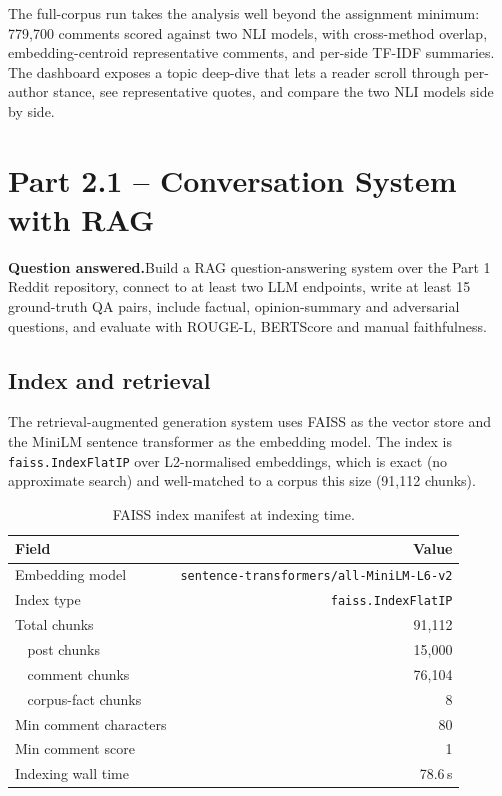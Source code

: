 \documentclass[11pt,a4paper]{article}
\newenvironment{extrabox}{%
  \par\medskip\noindent
  \def\FrameCommand{\fboxsep=6pt\fboxrule=0.6pt%
    \fcolorbox{extraboxrule}{extraboxbg}}%
  \MakeFramed{\advance\hsize-2\fboxsep\FrameRestore}%
  \noindent{\sffamily\bfseries\color{extraboxrule}Extra step.}\quad\ignorespaces%
}{\endMakeFramed\par\medskip}
\newcommand{\questionanswered}[1]{%
  \par\medskip\noindent\textbf{Question answered.}\quad #1\par\medskip%
}
\begin{document}
\begin{extrabox}
The full-corpus run takes the analysis well beyond the assignment minimum: 779{,}700 comments
scored against two NLI models, with cross-method overlap, embedding-centroid representative
comments, and per-side TF-IDF summaries. The dashboard exposes a topic deep-dive that lets a
reader scroll through per-author stance, see representative quotes, and compare the two NLI
models side by side.
\end{extrabox}

\section{Part 2.1 -- Conversation System with RAG}
\label{sec:21}

\questionanswered{Build a RAG question-answering system over the Part 1 Reddit repository,
connect to at least two LLM endpoints, write at least 15 ground-truth QA pairs, include factual,
opinion-summary and adversarial questions, and evaluate with ROUGE-L, BERTScore and manual
faithfulness.}

\subsection{Index and retrieval}
The retrieval-augmented generation system uses FAISS as the vector store and the MiniLM sentence
transformer as the embedding model. The index is
\texttt{faiss.IndexFlatIP} over L2-normalised embeddings, which is exact (no approximate
search) and well-matched to a corpus this size (91{,}112 chunks).

\begin{table}[H]
\centering
\small
\caption{FAISS index manifest at indexing time.}
\label{tab:faiss}
\renewcommand{\arraystretch}{1.1}
\begin{tabular}{lr}
\toprule
\textbf{Field} & \textbf{Value} \\
\midrule
Embedding model           & \texttt{sentence-transformers/all-MiniLM-L6-v2} \\
Index type                & \texttt{faiss.IndexFlatIP} \\
Total chunks              & 91{,}112 \\
$\;\;$ post chunks        & 15{,}000 \\
$\;\;$ comment chunks     & 76{,}104 \\
$\;\;$ corpus-fact chunks & 8 \\
Min comment characters    & 80 \\
Min comment score         & 1 \\
Indexing wall time        & 78.6\,s \\
\bottomrule
\end{tabular}
\end{table}
\end{document}
